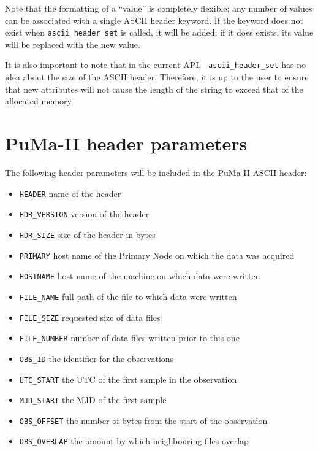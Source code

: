 Note that the formatting of a ``value'' is completely flexible; any
number of values can be associated with a single ASCII header keyword.
If the keyword does not exist when {\tt ascii\_header\_set} is called,
it will be added; if it does exists, its value will be replaced with
the new value.

It is also important to note that in the current API, {\tt
ascii\_header\_set} has no idea about the size of the ASCII header.
Therefore, it is up to the user to ensure that new attributes will not
cause the length of the string to exceed that of the allocated memory.

\section{PuMa-II header parameters}

The following header parameters will be included in the PuMa-II ASCII header:
\begin{itemize}
\item{\tt HEADER} name of the header
\vspace{-2mm}
\item{\tt HDR\_VERSION} version of the header
\vspace{-2mm}
\item{\tt HDR\_SIZE} size of the header in bytes
\vspace{-2mm}
\item{\tt PRIMARY} host name of the Primary Node on which the data was acquired
\vspace{-2mm}
\item{\tt HOSTNAME} host name of the machine on which data were written
\vspace{-2mm}
\item{\tt FILE\_NAME} full path of the file to which data were written
\vspace{-2mm}
\item{\tt FILE\_SIZE} requested size of data files
\vspace{-2mm}
\item{\tt FILE\_NUMBER} number of data files written prior to this one
\vspace{-2mm}
\item{\tt OBS\_ID} the identifier for the observations
\vspace{-2mm}
\item{\tt UTC\_START} the UTC of the first sample in the observation
\vspace{-2mm}
\item{\tt MJD\_START} the MJD of the first sample
\vspace{-2mm}
\item{\tt OBS\_OFFSET} the number of bytes from the start of the observation
\vspace{-2mm}
\item{\tt OBS\_OVERLAP} the amount by which neighbouring files overlap
\end{itemize}

